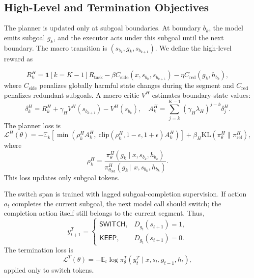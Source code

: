 \documentclass{article}
\newcommand{\wei}[1]{\textcolor{red}{#1}}
\begin{document}
\subsection{High-Level and Termination Objectives}

The planner is updated only at subgoal boundaries. At boundary $b_k$, the model emits subgoal $g_k$, and the executor acts under this subgoal until the next boundary. The macro transition is $(s_{b_k},g_k,s_{b_{k+1}})$. We define the high-level reward as 

\begin{equation}
R_k^H
=
\mathbf{1}[k=K-1]R_{\mathrm{task}}
-
\beta C_{\mathrm{side}}(x,s_{b_k},s_{b_{k+1}})
-
\eta C_{\mathrm{red}}(g_k,h_{b_k}),
\label{eq:high_reward}
\end{equation}
where $C_{\mathrm{side}}$ penalizes globally harmful state changes during the segment and $C_{\mathrm{red}}$ penalizes redundant subgoals. A macro critic $V^H$ estimates boundary-state values:
\begin{equation}
\delta_k^H
=
R_k^H+\gamma_H V^H(s_{b_{k+1}})-V^H(s_{b_k}),
\quad
A_k^H
=
\sum_{j=k}^{K-1}
(\gamma_H\lambda_H)^{j-k}\delta_j^H.
\label{eq:macro_gae}
\end{equation}
The planner loss is
\begin{equation}
\mathcal{L}^H(\theta)
=
-\mathbb{E}_k
\left[
\min
\left(
\rho_k^H A_k^H,\ 
\mathrm{clip}(\rho_k^H,1-\epsilon,1+\epsilon)A_k^H
\right)
\right]
+
\beta_H\mathrm{KL}(\pi_\theta^H\|\pi_{\mathrm{ref}}^H),
\label{eq:high_loss}
\end{equation}
where
\begin{equation}
\rho_k^H
=
\frac{
\pi_\theta^H(g_k\mid x,s_{b_k},h_{b_k})
}{
\pi_{\theta_{\mathrm{old}}}^H(g_k\mid x,s_{b_k},h_{b_k})
}.
\end{equation}
This loss updates only subgoal tokens.



The switch span is trained with lagged subgoal-completion supervision. If action $a_t$ completes the current subgoal, the next model call should switch; the completion action itself still belongs to the current segment. Thus,
\begin{equation}
y_{t+1}^T
=
\begin{cases}
\mathsf{SWITCH}, & D_{g_t}(s_{t+1})=1,\\
\mathsf{KEEP}, & D_{g_t}(s_{t+1})=0.
\end{cases}
\label{eq:switch_target}
\end{equation}
The termination loss is
\begin{equation}
\mathcal{L}^T(\theta)
=
-\mathbb{E}_t
\log
\pi_\theta^T(y_t^T\mid x,s_t,g_{t-1},h_t),
\label{eq:switch_loss}
\end{equation}
applied only to switch tokens.
\end{document}
